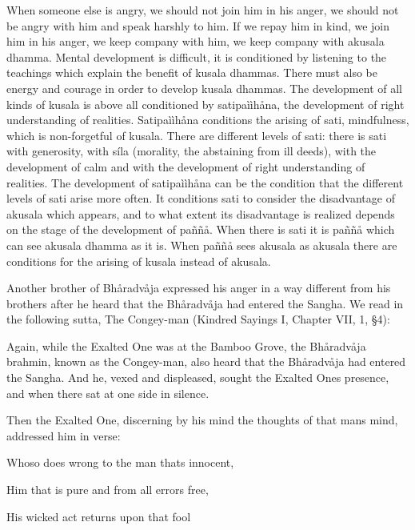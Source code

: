 \documentclass[12pt,twoside]{article}
\begin{document}
When someone else is angry, we should not join him in his anger, we
should not be angry with him and speak harshly to him. If we repay him
in kind, we join him in his anger, we keep company with him, we keep
company with akusala dhamma. Mental development is difficult, it is
conditioned by listening to the teachings which explain the benefit of
kusala dhammas. There must also be energy and courage in order to
develop kusala dhammas. The development of all kinds of kusala is above
all conditioned by satipa\`i\`ih{\aa}na, the development of right
understanding of realities. Satipa\`i\`ih{\aa}na conditions the arising
of sati, mindfulness, which is non{}-forgetful of kusala. There are
different levels of sati: there is sati with generosity, with s\'ila
(morality, the abstaining from ill deeds), with the development of calm
and with the development of right understanding of realities. The
development of satipa\`i\`ih{\aa}na can be the condition that the
different levels of sati arise more often. It conditions sati to
consider the disadvantage of akusala which appears, and to what extent
its disadvantage is realized depends on the stage of the development of
pa\~n\~n{\aa}. When there is sati it is pa\~n\~n{\aa} which can see
akusala dhamma as it is. When pa\~n\~n{\aa} sees akusala as akusala
there are conditions for the arising of kusala instead of akusala. 

Another brother of Bh{\aa}radv{\aa}ja expressed his anger in a way
different from his brothers after he heard that the Bh{\aa}radv{\aa}ja
had entered the Sangha. We read in the following sutta,
{\textasciigrave}{\textasciigrave}The
Congey{}-man{\textquotesingle}{\textquotesingle} (Kindred Sayings I,
Chapter VII, 1, {\S}4):


\bigskip

Again, while the Exalted One was at the Bamboo Grove, the
Bh{\aa}radv{\aa}ja brahmin, known as the Congey{}-man, also heard that
the Bh{\aa}radv{\aa}ja had entered the Sangha. And he, vexed and
displeased, sought the Exalted One{\textquotesingle}s presence, and
when there sat at one side in silence. 

Then the Exalted One, discerning by his mind the thoughts of that
man{\textquotesingle}s mind, addressed him in verse: 


\bigskip

Whoso does wrong to the man that{\textquotesingle}s innocent, 

Him that is pure and from all errors free, 

His wicked act returns upon that fool 
\end{document}
